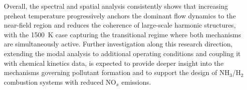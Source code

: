 Overall, the spectral and spatial analysis consistently shows that increasing preheat temperature progressively anchors the dominant flow dynamics to the near-field region and reduces the coherence of large-scale harmonic structures, with the 1500~K case capturing the transitional regime where both mechanisms are simultaneously active. Further investigation along this research direction, extending the modal analysis to additional operating conditions and coupling it with chemical kinetics data, is expected to provide deeper insight into the mechanisms governing pollutant formation and to support the design of NH$_3$/H$_2$ combustion systems with reduced NO$_x$ emissions.

